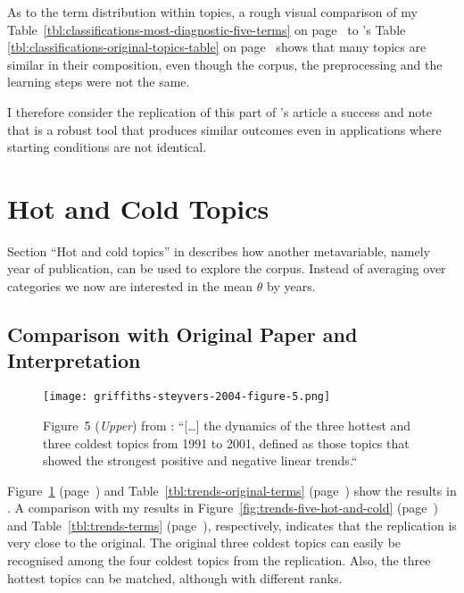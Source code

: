 

As to the term distribution within topics, a rough visual comparison of my Table~\ref{tbl:classifications-most-diagnostic-five-terms} on page~\pageref{tbl:classifications-most-diagnostic-five-terms} to 's Table \ref{tbl:classifications-original-topics-table} on page~\pageref{tbl:classifications-original-topics-table} shows that many topics are similar in their composition, even though the corpus, the preprocessing and the learning steps were not the same.

I therefore consider the replication of this part of 's article a success and note that  is a robust tool that produces similar outcomes even in applications where starting conditions are not identical.


\section{Hot and Cold Topics}
Section ``Hot and cold topics'' in \citet{Griffiths2004} describes how another metavariable, namely year of publication, can be used to explore the corpus. Instead of averaging over categories we now are interested in the mean $\theta$ by years.



\subsection{Comparison with Original Paper and Interpretation}

\begin{figure}[htbp]
\begin{center}
\texttt{[image: griffiths-steyvers-2004-figure-5.png]} %
\caption{Figure~5 (\emph{Upper}) from : ``[\dots] the dynamics of the three hottest and three coldest topics from 1991 to 2001, defined as those topics that showed the strongest positive and negative linear trends.``}
\label{fig:griffiths-steyvers-2004-figure-5}
\end{center}
\end{figure}



Figure~\ref{fig:griffiths-steyvers-2004-figure-5} (page~\pageref{fig:griffiths-steyvers-2004-figure-5}) and Table~\ref{tbl:trends-original-terms} (page~\pageref{tbl:trends-original-terms}) show the results in . A comparison with my results in Figure~\ref{fig:trends-five-hot-and-cold} (page~\pageref{fig:trends-five-hot-and-cold}) and Table~\ref{tbl:trends-terms} (page~\pageref{tbl:trends-terms}), respectively, indicates that the replication is very close to the original. The original three coldest topics can easily be recognised among the four coldest topics from the replication. Also, the three hottest topics can be matched, although with different ranks.

